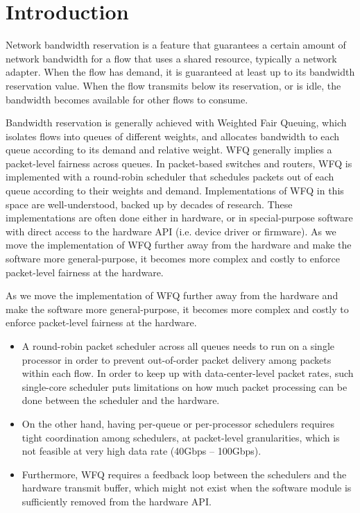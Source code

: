 \section{Introduction}

Network bandwidth reservation is a feature that guarantees a certain amount of
network bandwidth for a flow that uses a shared resource, typically a network
adapter.  When the flow has demand, it is guaranteed at least up to its
bandwidth reservation value.  When the flow transmits below its reservation, or
is idle, the bandwidth becomes available for other flows to consume.  

Bandwidth reservation is generally achieved with Weighted Fair Queuing, which
isolates flows into queues of different weights, and allocates bandwidth to each
queue according to its demand and relative weight.  WFQ generally implies a
packet-level fairness across queues.  In packet-based switches and routers, WFQ
is implemented with a round-robin scheduler that schedules packets out of each
queue according to their weights and demand.  Implementations of WFQ in this
space are well-understood, backed up by decades of research.  These
implementations are often done either in hardware, or in special-purpose
software with direct access to the hardware API (i.e. device driver or
firmware).  As we move the implementation of WFQ further away from the hardware
and make the software more general-purpose, it becomes more complex and costly
to enforce packet-level fairness at the hardware.

As we move the implementation of WFQ further away from the hardware and make the
software more general-purpose, it becomes more complex and costly to enforce
packet-level fairness at the hardware.

\begin{itemize}
\item
A round-robin packet scheduler across all queues needs to run on a single
processor in order to prevent out-of-order packet delivery among packets within
each flow.  In order to keep up with data-center-level packet rates, such
single-core scheduler puts limitations on how much packet processing can be done
between the scheduler and the hardware.
\item
On the other hand, having per-queue or per-processor schedulers requires tight
coordination among schedulers, at packet-level granularities, which is not
feasible at very high data rate (40Gbps -- 100Gbps).  
\item
Furthermore, WFQ requires a feedback loop between the schedulers and the
hardware transmit buffer, which might not exist when the software module is
sufficiently removed from the hardware API.
\end{itemize}

